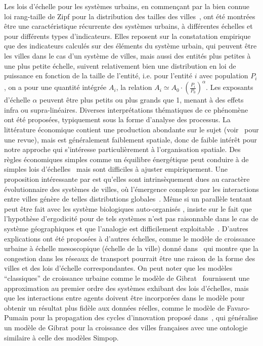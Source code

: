 {Les lois d'échelle pour les systèmes urbains, en commençant par la bien connue loi rang-taille de Zipf pour la distribution des tailles des villes~\cite{gabaix1999zipf}, ont été montrées être une caractéristique récurrente des systèmes urbains, à différentes échelles et pour différents types d'indicateurs. Elles reposent sur la constatation empirique que des indicateurs calculés sur des éléments du système urbain, qui peuvent être les villes dans le cas d'un système de villes, mais aussi des entités plus petites à une plus petite échelle, suivent relativement bien une distribution en loi de puissance en fonction de la taille de l'entité, i.e. pour l'entité $i$ avec population $P_i$, on a pour une quantité intégrée $A_i$, la relation $A_i \simeq A_0\cdot \left(\frac{P_i}{P_0}\right)^{\alpha}$. Les exposants d'échelle $\alpha$ peuvent être plus petits ou plus grands que 1, menant à des effets infra ou supra-linéaires. Diverses interprétations thématiques de ce phénomène ont été proposées, typiquement sous la forme d'analyse des processus. La littérature économique contient une production abondante sur le sujet (voir~\cite{Gabaix20042341} pour une revue), mais est généralement faiblement spatiale, donc de faible intérêt pour notre approche qui s'intéresse particulièrement à l'organisation spatiale. Des règles économiques simples comme un équilibre énergétique peut conduire à de simples lois d'échelles~\cite{bettencourt2008large} mais sont difficiles à ajuster empiriquement. Une proposition intéressante par  est qu'elles sont intrinsèquement dues au caractère évolutionnaire des systèmes de villes, où l'émergence complexe par les interactions entre villes génère de telles distributions globales~\cite{pumain2006evolutionary}. Même si un parallèle tentant peut être fait avec les système biologiques auto-organisés %
 ,  insiste sur le fait que l'hypothèse d'ergodicité pour de tels systèmes n'est pas raisonnable dans le cas de système géographiques et que l'analogie est difficilement exploitable~\cite{pumain2012urban}. D'autres explications ont été proposées à d'autres échelles, comme le modèle de croissance urbaine à échelle mesoscopique (échelle de la ville) donné dans~\cite{2014arXiv1401.8200L} qui montre que la congestion dans les réseaux de transport pourrait être une raison de la forme des villes et des lois d'échelle correspondantes. On peut noter que les modèles ``classiques'' de croissance urbaine comme le modèle de Gibrat~\cite{favaro2011gibrat} fournissent une approximation au premier ordre des systèmes %
  exhibant des lois d'échelles, mais que les interactions entre agents doivent être incorporées dans le modèle pour obtenir un résultat plus fidèle aux données réelles, comme le modèle de Favaro-Pumain pour la propagation des cycles d'innovation proposé dans~\cite{favaro2011gibrat}, qui généralise un modèle de Gibrat pour la croissance des villes françaises avec une ontologie similaire à celle des modèles Simpop.
}


